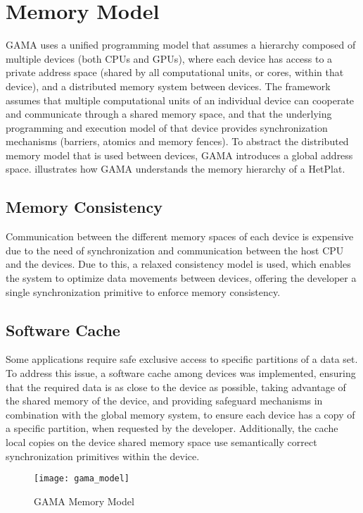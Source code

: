 \documentclass[main.tex]{subfiles}
\begin{document}
\section{Memory Model}

\acs{GAMA} uses a unified programming model that assumes a hierarchy composed of multiple devices (both \acsp{CPU} and \acsp{GPU}), where each device has access to a private address space (shared by all computational units, or cores, within that device), and a distributed memory system between devices. The framework assumes that multiple computational units of an individual device can cooperate and communicate through a shared memory space, and that the underlying programming and execution model of that device provides synchronization mechanisms (barriers, atomics and memory fences).
To abstract the distributed memory model that is used between devices, \acs{GAMA} introduces a global address space.  illustrates how \acs{GAMA} understands the memory hierarchy of a \acs{HetPlat}.


\subsection{Memory Consistency}

Communication between the different memory spaces of each device is expensive due to the need of synchronization and communication between the host \ac{CPU} and the devices. Due to this, a relaxed consistency model is used, which enables the system to optimize data movements between devices, offering the developer a single synchronization primitive to enforce memory consistency.

\subsection{Software Cache}

Some applications require safe exclusive access to specific partitions of a data set. To address this issue, a software cache among devices was implemented, ensuring that the required data is as close to the device as possible, taking advantage of the shared memory of the device, and providing safeguard mechanisms in combination with the global memory system, to ensure each device has a copy of a specific partition, when requested by the developer. Additionally, the cache local copies on the device shared memory space use semantically correct synchronization primitives within the device.

\begin{figure}[!htp]
  \centering
  \texttt{[image: gama\_model]}
  \caption{\acs{GAMA} Memory Model \label{fig:gama_memory_model}}
\end{figure}
\end{document}
